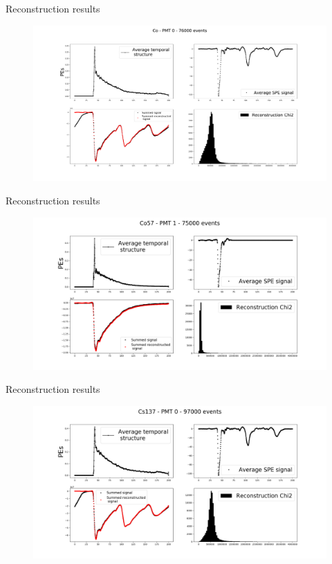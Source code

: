 \documentclass{beamer}
\begin{document}
\begin{frame}{Reconstruction results}
\begin{figure}[h]
\includegraphics[width=1\linewidth]{resultCo0.png}
\end{figure}
\end{frame}


\begin{frame}{Reconstruction results}
\begin{figure}[h]
\includegraphics[width=1\linewidth]{resultCo1.png}
\end{figure}
\end{frame}

\begin{frame}{Reconstruction results}
\begin{figure}[h]
\includegraphics[width=1\linewidth]{resultCs0.png}
\end{figure}
\end{frame}
\end{document}

